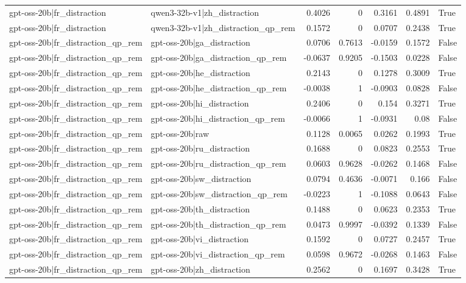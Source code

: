 \begin{table}
\begin{tabular}{l l r r r r l}
gpt-oss-20b|fr_distraction & qwen3-32b-v1|zh_distraction & 0.4026 & 0 & 0.3161 & 0.4891 & True \\
gpt-oss-20b|fr_distraction & qwen3-32b-v1|zh_distraction_qp_rem & 0.1572 & 0 & 0.0707 & 0.2438 & True \\
gpt-oss-20b|fr_distraction_qp_rem & gpt-oss-20b|ga_distraction & 0.0706 & 0.7613 & -0.0159 & 0.1572 & False \\
gpt-oss-20b|fr_distraction_qp_rem & gpt-oss-20b|ga_distraction_qp_rem & -0.0637 & 0.9205 & -0.1503 & 0.0228 & False \\
gpt-oss-20b|fr_distraction_qp_rem & gpt-oss-20b|he_distraction & 0.2143 & 0 & 0.1278 & 0.3009 & True \\
gpt-oss-20b|fr_distraction_qp_rem & gpt-oss-20b|he_distraction_qp_rem & -0.0038 & 1 & -0.0903 & 0.0828 & False \\
gpt-oss-20b|fr_distraction_qp_rem & gpt-oss-20b|hi_distraction & 0.2406 & 0 & 0.154 & 0.3271 & True \\
gpt-oss-20b|fr_distraction_qp_rem & gpt-oss-20b|hi_distraction_qp_rem & -0.0066 & 1 & -0.0931 & 0.08 & False \\
gpt-oss-20b|fr_distraction_qp_rem & gpt-oss-20b|raw & 0.1128 & 0.0065 & 0.0262 & 0.1993 & True \\
gpt-oss-20b|fr_distraction_qp_rem & gpt-oss-20b|ru_distraction & 0.1688 & 0 & 0.0823 & 0.2553 & True \\
gpt-oss-20b|fr_distraction_qp_rem & gpt-oss-20b|ru_distraction_qp_rem & 0.0603 & 0.9628 & -0.0262 & 0.1468 & False \\
gpt-oss-20b|fr_distraction_qp_rem & gpt-oss-20b|sw_distraction & 0.0794 & 0.4636 & -0.0071 & 0.166 & False \\
gpt-oss-20b|fr_distraction_qp_rem & gpt-oss-20b|sw_distraction_qp_rem & -0.0223 & 1 & -0.1088 & 0.0643 & False \\
gpt-oss-20b|fr_distraction_qp_rem & gpt-oss-20b|th_distraction & 0.1488 & 0 & 0.0623 & 0.2353 & True \\
gpt-oss-20b|fr_distraction_qp_rem & gpt-oss-20b|th_distraction_qp_rem & 0.0473 & 0.9997 & -0.0392 & 0.1339 & False \\
gpt-oss-20b|fr_distraction_qp_rem & gpt-oss-20b|vi_distraction & 0.1592 & 0 & 0.0727 & 0.2457 & True \\
gpt-oss-20b|fr_distraction_qp_rem & gpt-oss-20b|vi_distraction_qp_rem & 0.0598 & 0.9672 & -0.0268 & 0.1463 & False \\
gpt-oss-20b|fr_distraction_qp_rem & gpt-oss-20b|zh_distraction & 0.2562 & 0 & 0.1697 & 0.3428 & True \\

\end{tabular}
\end{table}
